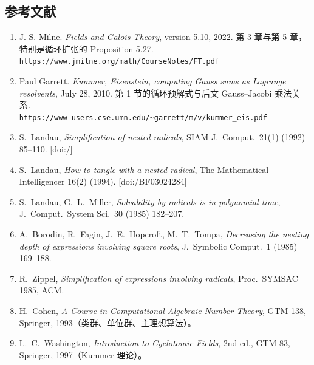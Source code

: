 \documentclass[UTF8,a4paper,11pt]{ctexart}
\begin{document}
\subsection{参考文献}
{\sloppy
\begin{enumerate}

 \item J. S. Milne. \emph{Fields and Galois Theory}, version 5.10, 2022.
       第 3 章与第 5 章，特别是循环扩张的 Proposition 5.27.\\
       \texttt{https://www.jmilne.org/math/CourseNotes/FT.pdf}
 \item Paul Garrett. \emph{Kummer, Eisenstein, computing Gauss sums as Lagrange resolvents},
       July 28, 2010. 第 1 节的循环预解式与后文 Gauss--Jacobi 乘法关系.\\
       \texttt{https://www-users.cse.umn.edu/\~{}garrett/m/v/kummer\_eis.pdf}

\item S.~Landau, \emph{Simplification of nested radicals}, SIAM J.~Comput.\ 21(1)
(1992) 85--110. [doi:/]
\item S.~Landau, \emph{How to tangle with a nested radical},
The Mathematical Intelligencer 16(2) (1994). [doi:/\allowbreak BF03024284]
\item S.~Landau, G.~L.~Miller, \emph{Solvability by radicals is in polynomial time},
J.~Comput.\ System Sci.\ 30 (1985) 182--207.
\item A.~Borodin, R.~Fagin, J.~E.~Hopcroft, M.~T.~Tompa,
\emph{Decreasing the nesting depth of expressions involving square roots},
J.~Symbolic Comput.\ 1 (1985) 169--188.
\item R.~Zippel, \emph{Simplification of expressions involving radicals},
Proc.\ SYMSAC 1985, ACM.
\item H.~Cohen, \emph{A Course in Computational Algebraic Number Theory},
GTM 138, Springer, 1993（类群、单位群、主理想算法）。
\item L.~C.~Washington, \emph{Introduction to Cyclotomic Fields}, 2nd ed., GTM 83,
Springer, 1997（Kummer 理论）。
\end{enumerate}
}
\end{document}
